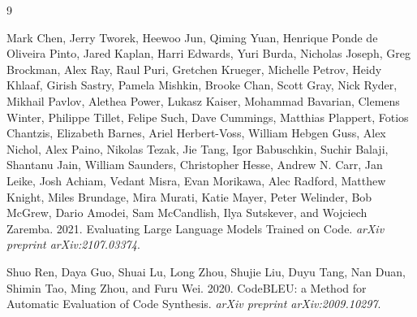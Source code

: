 \documentclass[sigconf,review]{acmart}
\begin{document}
\begin{thebibliography}{9}

Mark Chen, Jerry Tworek, Heewoo Jun, Qiming Yuan, Henrique Ponde de Oliveira Pinto, Jared Kaplan, Harri Edwards, Yuri Burda, Nicholas Joseph, Greg Brockman, Alex Ray, Raul Puri, Gretchen Krueger, Michelle Petrov, Heidy Khlaaf, Girish Sastry, Pamela Mishkin, Brooke Chan, Scott Gray, Nick Ryder, Mikhail Pavlov, Alethea Power, Lukasz Kaiser, Mohammad Bavarian, Clemens Winter, Philippe Tillet, Felipe Such, Dave Cummings, Matthias Plappert, Fotios Chantzis, Elizabeth Barnes, Ariel Herbert-Voss, William Hebgen Guss, Alex Nichol, Alex Paino, Nikolas Tezak, Jie Tang, Igor Babuschkin, Suchir Balaji, Shantanu Jain, William Saunders, Christopher Hesse, Andrew N. Carr, Jan Leike, Josh Achiam, Vedant Misra, Evan Morikawa, Alec Radford, Matthew Knight, Miles Brundage, Mira Murati, Katie Mayer, Peter Welinder, Bob McGrew, Dario Amodei, Sam McCandlish, Ilya Sutskever, and Wojciech Zaremba. 2021. Evaluating Large Language Models Trained on Code. \emph{arXiv preprint arXiv:2107.03374}.

Shuo Ren, Daya Guo, Shuai Lu, Long Zhou, Shujie Liu, Duyu Tang, Nan Duan, Shimin Tao, Ming Zhou, and Furu Wei. 2020. CodeBLEU: a Method for Automatic Evaluation of Code Synthesis. \emph{arXiv preprint arXiv:2009.10297}.

\end{thebibliography}
\end{document}
